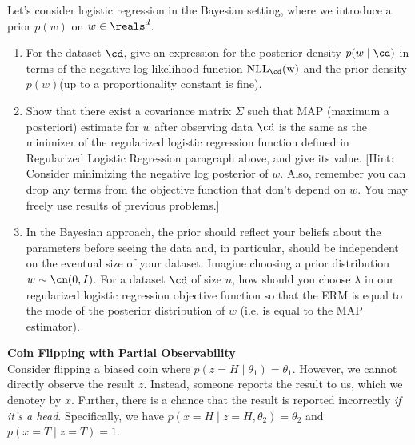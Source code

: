 \documentclass{article}
\newcommand{\nyuparagraph}[1]{\vspace{0.3cm}\textcolor{nyupurple}{\bf \large #1}\\}
\newcommand{\nll}{\rm NLL}
\theoremstyle{plain}
\theoremstyle{definition}
\begin{document}
Let's consider logistic regression in the Bayesian setting, where we introduce a prior $p(w)$ on  $w\in\reals^{d}$. 
\begin{enumerate}
  \setcounter{enumi}{\value{saveenum}}
\item For the dataset $\cd$, give an expression for the posterior density $p
 (w\mid\cd)$ in terms of the negative log-likelihood function $\nll_{\cd}
 (w)$ and the prior density $p(w)$(up to a proportionality constant is
 fine).

\item Show that there exist a covariance matrix $\Sigma$ such that MAP (maximum a posteriori) estimate for $w$
after observing data $\cd$ is the same as the minimizer of the regularized
logistic regression function defined in Regularized Logistic Regression paragraph above, and give its value. {[}Hint: Consider minimizing the negative log posterior
of $w$. Also, remember you can drop any terms from the objective
function that don't depend on $w$. You may freely use results
of previous problems.{]} 

\item In the Bayesian approach, the prior should reflect your beliefs about
the parameters before seeing the data and, in particular, should be
independent on the eventual size of your dataset. Imagine choosing a prior distribution $w\sim\cn(0,I)$. For a dataset $\cd$
of size $n$, how should you choose $\lambda$ in our regularized
logistic regression objective function so that the ERM is equal
to the mode of the posterior distribution of $w$ (i.e. is equal to
the MAP estimator). 
\setcounter{saveenum}{\value{enumi}}
\end{enumerate}

\nyuparagraph{Coin Flipping with Partial Observability}
Consider flipping a biased coin where $p(z=H\mid \theta_1) = \theta_1$.
However, we cannot directly observe the result $z$.
Instead, someone reports the result to us,
which we denotey by $x$.
Further, there is a chance that the result is reported incorrectly \emph{if it's a head}.
Specifically, we have $p(x=H\mid z=H, \theta_2) = \theta_2$
and $p(x=T\mid z=T) = 1$.
\end{document}
